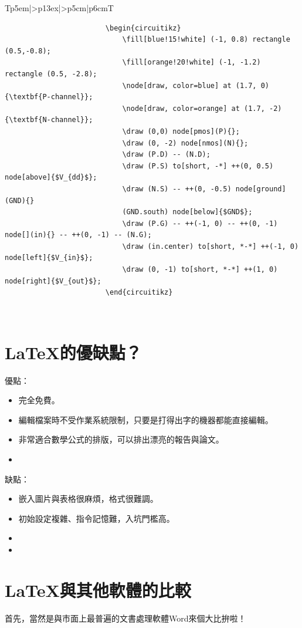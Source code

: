 \documentclass[12pt, a4paper, oneside]{extbook}
\let\tmpLaTeX\LaTeX
\renewcommand{\LaTeX}{\textrm{\tmpLaTeX}}
\newcommand{\Thline}{\Xhline{2\arrayrulewidth}}
\begin{document}
\begin{table}[H]
\begin{tabular}{Tp{5em}|>{\ttfamily}p{13ex}|>{\sffamily}p{5cm}|p{6cm}T}
\begin{minipage}[t]{\linewidth}
\begin{verbatim}
						\begin{circuitikz}
							\fill[blue!15!white] (-1, 0.8) rectangle (0.5,-0.8);
							\fill[orange!20!white] (-1, -1.2) rectangle (0.5, -2.8);
							\node[draw, color=blue] at (1.7, 0){\textbf{P-channel}};
							\node[draw, color=orange] at (1.7, -2){\textbf{N-channel}};
							\draw (0,0) node[pmos](P){};
							\draw (0, -2) node[nmos](N){};
							\draw (P.D) -- (N.D);
							\draw (P.S) to[short, -*] ++(0, 0.5) node[above]{$V_{dd}$};
							\draw (N.S) -- ++(0, -0.5) node[ground](GND){}
							(GND.south) node[below]{$GND$};
							\draw (P.G) -- ++(-1, 0) -- ++(0, -1) node[](in){} -- ++(0, -1) -- (N.G);
							\draw (in.center) to[short, *-*] ++(-1, 0) node[left]{$V_{in}$};
							\draw (0, -1) to[short, *-*] ++(1, 0) node[right]{$V_{out}$};
						\end{circuitikz}
					\end{verbatim}
				\end{minipage} \\ \Thline
			\end{tabular}
			\label{tab: Applications of LaTeX}	
		\end{table}
	\section{\LaTeX 的優缺點？}
		優點：
		\begin{itemize}
			\item 完全免費。
			\item 編輯檔案時不受作業系統限制，只要是打得出字的機器都能直接編輯。
			\item 非常適合數學公式的排版，可以排出漂亮的報告與論文。
			\item 
		\end{itemize}
		
		缺點：
		\begin{itemize}
			\item 嵌入圖片與表格很麻煩，格式很難調。
			\item 初始設定複雜、指令記憶難，入坑門檻高。
			\item 
			\item 
		\end{itemize}

	\section{\LaTeX 與其他軟體的比較}
		首先，當然是與市面上最普遍的文書處理軟體Word來個大比拚啦！
		
\end{document}
